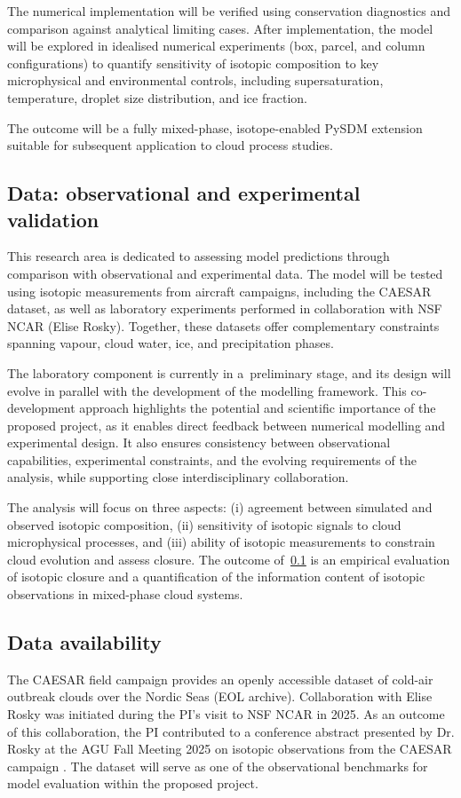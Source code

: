 \documentclass[12pt]{article}
\begin{document}
The numerical implementation will be verified using conservation diagnostics
and comparison against analytical limiting cases.
After implementation, the model will be explored in idealised numerical
experiments (box, parcel, and column configurations) to quantify sensitivity
of isotopic composition to key microphysical and environmental controls,
including supersaturation, temperature, droplet size distribution, and ice fraction.

The outcome will be a fully mixed-phase, isotope-enabled PySDM extension
suitable for subsequent application to cloud process studies.

\subsection{Data: observational and experimental validation}\label{A3}
This research area is dedicated to assessing model predictions through
comparison with observational and experimental data.
The model will be tested using isotopic measurements from aircraft campaigns,
including the CAESAR dataset, as well as laboratory experiments
performed in collaboration with NSF NCAR (Elise Rosky).
Together, these datasets offer complementary constraints spanning vapour,
cloud water, ice, and precipitation phases.

The laboratory component is currently in a~preliminary stage,
and its design will evolve in parallel with the development
of the modelling framework.
This co-development approach highlights the potential and scientific
importance of the proposed project,
as it enables direct feedback between numerical modelling
and experimental design.
It also ensures consistency between observational capabilities,
experimental constraints, and the evolving requirements of the analysis,
while supporting close interdisciplinary collaboration.

The analysis will focus on three aspects:
(i) agreement between simulated and observed isotopic composition,
(ii) sensitivity of isotopic signals to cloud microphysical processes, and
(iii) ability of isotopic measurements to constrain cloud evolution and assess
closure.
The outcome of~\ref{A3} is an empirical evaluation of isotopic closure and a
quantification of the information content of isotopic observations in
mixed-phase cloud systems.

\subsection*{Data availability}
The CAESAR field campaign provides an openly accessible dataset of cold-air outbreak
clouds over the Nordic Seas (EOL archive).
Collaboration with Elise Rosky was initiated during the PI's visit to NSF NCAR in 2025.
As an outcome of this collaboration, the PI contributed to a conference abstract
presented by Dr. Rosky at the AGU Fall Meeting 2025 on isotopic observations
from the CAESAR campaign \parencite{2025_Rosky_MixedPhaseIsotopes}.
The dataset will serve as one of the observational benchmarks
for model evaluation within the proposed project.
\end{document}
